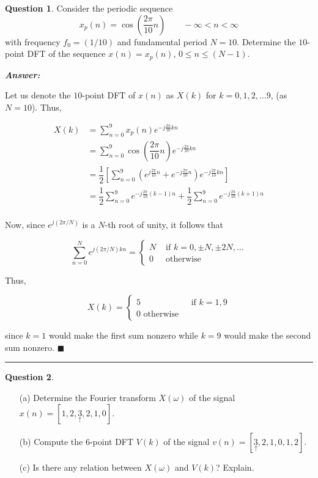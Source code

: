 \documentclass[12pt]{article}
\theoremstyle{definition}
\newtheorem{question}{Question}
\newenvironment{answer}{
    \textbf{\textit{Answer:}} \qquad
}{\hfill $\blacksquare$ \\ \begin{center}
    \rule{0.6\linewidth}{0.5px}    
\end{center}
}
\begin{document}
\begin{question}
    Consider the periodic sequence 
    $$
    x_p(n) = \cos\left( \dfrac{2\pi}{10} n\right) \qquad -\infty < n < \infty
    $$
    with frequency $f_0 = (1/10)$ and fundamental period $N = 10$. Determine the $10$-point DFT of the sequence $x(n) = x_p(n)$, $0 \leq n \leq (N-1)$.
\end{question}

\begin{answer}
    Let us denote the $10$-point DFT of $x(n)$ as $X(k)$ for $k = 0, 1, 2, \dots 9$, (as $N = 10$). Thus,

    \begin{align*}
        X(k)
        & = \sum_{n = 0}^{9} x_p(n) e^{-j\frac{2\pi}{10}kn}\\
        & = \sum_{n = 0}^{9} \cos\left( \dfrac{2\pi}{10}n \right) e^{-j\frac{2\pi}{10}kn}\\
        & = \dfrac{1}{2} \left[\sum_{n = 0}^{9} \left(e^{j\frac{2\pi}{10}n} + e^{-j\frac{2\pi}{10}n}\right) e^{-j\frac{2\pi}{10}kn}\right]\\
        & = \dfrac{1}{2} \sum_{n = 0}^{9} e^{-j\frac{2\pi}{10}(k-1)n} + \dfrac{1}{2} \sum_{n = 0}^{9} e^{-j\frac{2\pi}{10}(k+1)n}\\
    \end{align*}

    Now, since $e^{j(2\pi/N)}$ is a $N$-th root of unity, it follows that 

    $$
    \sum_{n = 0}^{N} e^{j(2\pi / N)kn} = \begin{cases}
        N & \text{ if } k = 0, \pm N, \pm 2N, \dots\\
        0 & \text{ otherwise }
    \end{cases}
    $$

    Thus, 

    $$
    X(k) = \begin{cases}
        5 & \text{ if } k = 1, 9\\
        0 \text{ otherwise }
    \end{cases}
    $$

    since $k = 1$ would make the first sum nonzero while $k = 9$ would make the second sum nonzero.
\end{answer}

\begin{question}
    \begin{enumerate}
        \item[(a)] Determine the Fourier transform $X(\omega)$ of the signal $x(n) = [1, 2, \underset{\uparrow}{3}, 2, 1, 0]$.
        \item[(b)] Compute the $6$-point DFT $V(k)$ of the signal $v(n) = [\underset{\uparrow}{3}, 2, 1, 0, 1, 2]$.
        \item[(c)] Is there any relation between $X(\omega)$ and $V(k)$? Explain.  
    \end{enumerate}
\end{question}
\end{document}
